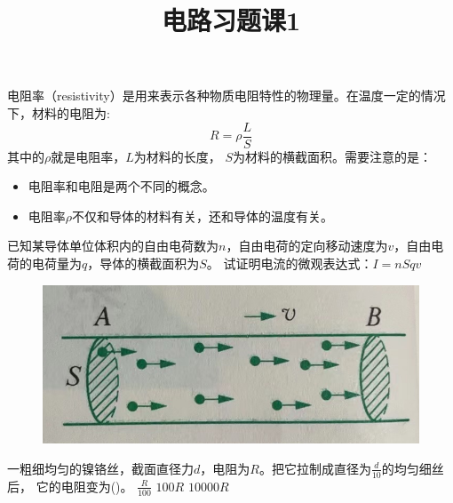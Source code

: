 \documentclass[a4paper,cs4size]{BHCexam}
\title{电路习题课1}
\begin{document}
\maketitle
\begin{groups}
    电阻率（resistivity）是用来表示各种物质电阻特性的物理量。在温度一定的情况下，材料的电阻为:
    $$R=\rho  \frac{L}{S}$$
    其中的$\rho$就是电阻率，$L$为材料的长度， $S$为材料的横截面积。需要注意的是：
    \begin{itemize}
        \item 电阻率和电阻是两个不同的概念。
        \item 电阻率$\rho$不仅和导体的材料有关，还和导体的温度有关。
    \end{itemize}

    \vspace{3cm}
    \begin{questions}[]

        \question[5]已知某导体单位体积内的自由电荷数为$n$，自由电荷的定向移动速度为$v$，自由电荷的电荷量为$q$，导体的横截面积为$S$。
        试证明电流的微观表达式：$I=nSqv$
        \begin{figure}[htb]
            \flushright
            \includegraphics [scale=0.25,trim=0 0 0 0]{./image/physics_circuit1_1.png}
            \label{fig:fig_circuit1_1}
        \end{figure}
        \vspace{3cm}

        \question[5] 一粗细均匀的镍铬丝，截面直径力$d$，电阻为$R$。把它拉制成直径为$\frac{d}{10}$的均匀细丝后，
        它的电阻变为(\quad\quad\quad)。
        {$\frac{R}{100}$}
        {$100R$}
        {$10000R$}
        \vspace{1.5cm}


\end{questions}
\end{groups}
\end{document}
